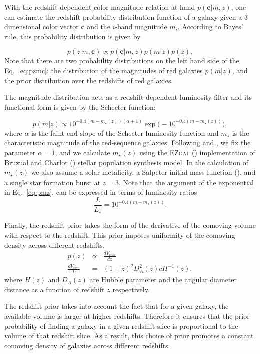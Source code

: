 \documentclass[fleqn,usenatbib]{mnras}
\newcommand{\be}{\begin{equation}}
\newcommand{\ee}{\end{equation}}
\newcommand{\vc}{\bm{c}}
\newcommand{\mi}{m_{i}}
\begin{document}
With the redshift dependent color-magnitude relation at hand $p(\vc|m,z)$, one can estimate the redshift probability distribution function of a galaxy given a 3 dimensional color vector $\vc$ and the $i$-band magnitude $\mi$. According to Bayes' rule, this probability distribution is given by  

\be
p(z|m,\vc) \propto p(\vc|m,z)p(m|z)p(z),
\label{eq:pzmc}
\ee
Note that there are two probability distributions on the left hand side of the Eq.~\ref{eq:pzmc}: the distribution of the magnitudes of red galaxies $p(m|z)$, and the prior distribution over the redshifts of red galaxies. 

The magnitude distribution acts as a redshift-dependent luminosity filter and its functional form is given by the Schecter function:

\be 
p(m|z) \propto 10^{-0.4(m-m_{\star}(z))(\alpha+1)} \exp\big( -10^{-0.4(m-m_{\star}(z))}\big), 
\label{eq:pmz}
\ee
where $\alpha$ is the faint-end slope of the Schecter luminosity function and $m_{\star}$ is the characteristic magnitude of the red-sequence galaxies. Following \citealt{redmap_des} and \citealt{rozo2016}, we fix the parameter $\alpha=1$, and we calculate $m_{\star}(z)$ using the \textsc{EZgal} (\citealt{ezgal_software,ezgal_paper}) implementation of Bruzual and Charlot (\citealt{bc03}) stellar population synthesis model. In the calculation of $m_{\star}(z)$ we also assume a solar metalicity, a Salpeter initial mass function (\citealt{chabrier2003}), and a single star formation burst at $z = 3$. Note that the argument of the exponential in Eq.~\ref{eq:pmz},  can be expressed in terms of luminosity ratios 
\be 
\frac{L}{L_{\star}} = 10^{-0.4(m-m_{\star}(z))}.
\label{eq:lratio}
\ee 

Finally, the redshift prior takes the form of the derivative of the comoving volume with respect to the redshift. This prior imposes uniformity of the comoving density across different redshifts.  
\begin{eqnarray}
p(z) & \propto & \frac{dV_{com}}{dz} \label{eq:pz}\\
\frac{dV_{com}}{dz} &=& (1+z)^{2}D_{A}^{2}(z)cH^{-1}(z),
\end{eqnarray} 
where $H(z)$ and $D_A(z)$ are Hubble parameter and the angular diameter distance as a function of redshift $z$ respectively. 

The redshift prior takes into account the fact that for a given galaxy, the available volume is larger at higher redshifts. Therefore it ensures that the prior probability of finding a galaxy in a given redshift slice is proportional to the volume of that redshift slice. As a result, this choice of prior promotes a constant comoving density of galaxies across different redshifts. 
\end{document}
